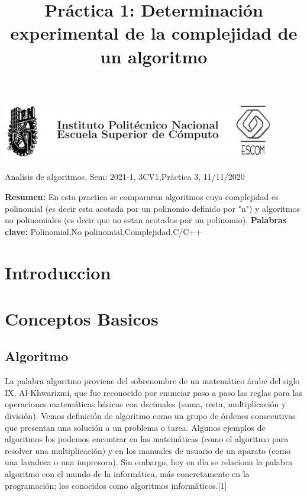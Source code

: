 \documentclass[spanish]{article}
\title {Práctica 1: Determinación experimental de la complejidad de un algoritmo}
\begin{document}
	\centerline{\includegraphics[width=450px,height=100px]{header}}
	\centerline{Analisis de algoritmos, Sem: 2021-1, 3CV1,Práctica  3, 11/11/2020}
	\centerline{}
	\bigskip
	\justify
	\textbf{Resumen:}	
	En esta practica se compararan algoritmos cuya complejidad es polinomial (es decir esta acotada por un polinomio definido por "n") y algoritmos no polinomiales (es decir que no estan acotados por un polinomio).
	\textbf{Palabras clave:}
	Polinomial,No polinomial,Complejidad,C/C++
	\section{Introduccion}
	
	\section{Conceptos Basicos}
	\subsection{Algoritmo}
	La palabra algoritmo proviene del sobrenombre de un matemático árabe del siglo IX, Al-Khwarizmi, que fue reconocido por enunciar paso a paso las reglas para las operaciones matemáticas básicas con decimales (suma, resta, multiplicación y división).	
	Vemos definición de algoritmo como un grupo de órdenes consecutivas que presentan una solución a un problema o tarea. Algunos ejemplos de algoritmos los podemos encontrar en las matemáticas (como el algoritmo para resolver una multiplicación) y en los manuales de usuario de un aparato (como una lavadora o una impresora).	
	Sin embargo, hoy en día se relaciona la palabra algoritmo con el mundo de la informática, más concretamente en la programación; los conocidos como algoritmos informáticos.[1]
\end{document}
